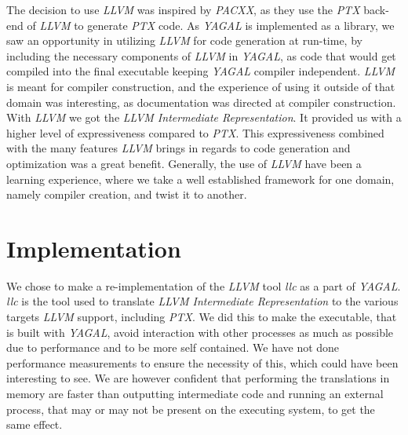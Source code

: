 The decision to use \textit{LLVM} was inspired by \textit{PACXX}, as they use the \textit{PTX} back-end of \textit{LLVM} to generate \textit{PTX} code. As \textit{YAGAL} is implemented as a library, we saw an opportunity in utilizing \textit{LLVM} for code generation at run-time, by including the necessary components of \textit{LLVM} in \textit{YAGAL}, as code that would get compiled into the final executable keeping \textit{YAGAL} compiler independent. \textit{LLVM} is meant for compiler construction, and the experience of using it outside of that domain was interesting, as documentation was directed at compiler construction. With \textit{LLVM} we got the \textit{LLVM Intermediate Representation}. It provided us with a higher level of expressiveness compared to \textit{PTX}. This expressiveness combined with the many features \textit{LLVM} brings in regards to code generation and optimization was a great benefit. Generally, the use of \textit{LLVM} have been a learning experience, where we take a well established framework for one domain, namely compiler creation, and twist it to another.

\section{Implementation}

We chose to make a re-implementation of the \textit{LLVM} tool \textit{llc} as a part of \textit{YAGAL}. \textit{llc} is the tool used to translate \textit{LLVM Intermediate Representation} to the various targets \textit{LLVM} support, including \textit{PTX}. We did this to make the executable, that is built with \textit{YAGAL}, avoid interaction with other processes as much as possible due to performance and to be more self contained. We have not done performance measurements to ensure the necessity of this, which could have been interesting to see. We are however confident that performing the translations in memory are faster than outputting intermediate code and running an external process, that may or may not be present on the executing system, to get the same effect.

